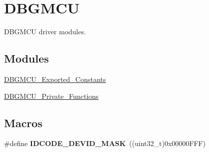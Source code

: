 \hypertarget{group___d_b_g_m_c_u}{\section{D\-B\-G\-M\-C\-U}
\label{group___d_b_g_m_c_u}
}


D\-B\-G\-M\-C\-U driver modules.  


\subsection*{Modules}
\begin{DoxyCompactItemize}
\item 
\hyperlink{group___d_b_g_m_c_u___exported___constants}{D\-B\-G\-M\-C\-U\-\_\-\-Exported\-\_\-\-Constants}
\item 
\hyperlink{group___d_b_g_m_c_u___private___functions}{D\-B\-G\-M\-C\-U\-\_\-\-Private\-\_\-\-Functions}
\end{DoxyCompactItemize}
\subsection*{Macros}
\begin{DoxyCompactItemize}
\item 
\hypertarget{group___d_b_g_m_c_u_gaeeece10cca80f3c632d3d77c3f2917b6}{\#define {\bfseries I\-D\-C\-O\-D\-E\-\_\-\-D\-E\-V\-I\-D\-\_\-\-M\-A\-S\-K}~((uint32\-\_\-t)0x00000\-F\-F\-F)}\label{group___d_b_g_m_c_u_gaeeece10cca80f3c632d3d77c3f2917b6}

\end{DoxyCompactItemize}
